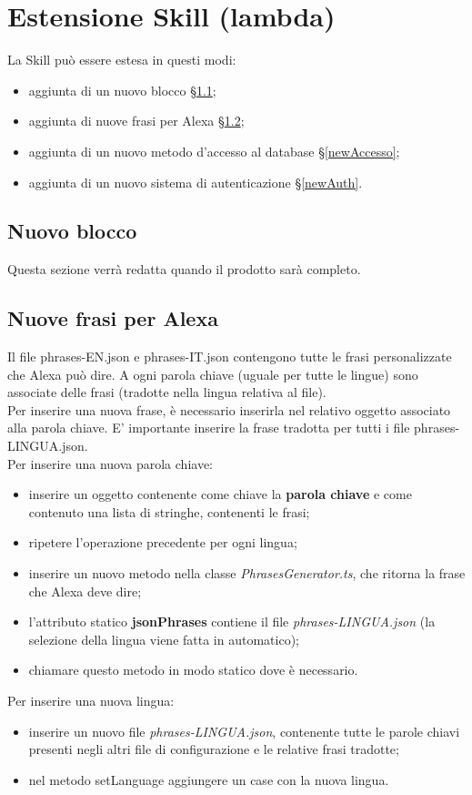 \section{Estensione Skill (lambda)}
La Skill può essere estesa in questi modi:
\begin{itemize}
    \item aggiunta di un nuovo blocco \S\ref{newBlock};
    \item aggiunta di nuove frasi per Alexa \S\ref{newFrasi};
    \item aggiunta di un nuovo metodo d'accesso al database \S\ref{newAccesso};
    \item aggiunta di un nuovo sistema di autenticazione \S\ref{newAuth}.
\end{itemize}
\subsection{Nuovo blocco}\label{newBlock}
Questa sezione verrà redatta quando il prodotto sarà completo.
\subsection{Nuove frasi per Alexa}\label{newFrasi}
Il file phrases-EN.json e phrases-IT.json contengono tutte le frasi personalizzate che Alexa può dire. A ogni parola chiave (uguale per tutte le lingue) sono associate delle frasi (tradotte nella lingua relativa al file).\\
Per inserire una nuova frase, è necessario inserirla nel relativo oggetto associato alla parola chiave. E' importante inserire la frase tradotta per tutti i file phrases-LINGUA.json.\\
Per inserire una nuova parola chiave:
\begin{itemize}
	\item inserire un oggetto contenente come chiave la \textbf{parola chiave} e come contenuto una lista di stringhe, contenenti le frasi;
	\item ripetere l'operazione precedente per ogni lingua;
	\item inserire un nuovo metodo nella classe \textit{PhrasesGenerator.ts}, che ritorna la frase che Alexa deve dire;
	\item l'attributo statico \textbf{jsonPhrases} contiene il file \textit{phrases-LINGUA.json} (la selezione della lingua viene fatta in automatico);
	\item chiamare questo metodo in modo statico dove è necessario.
\end{itemize}
Per inserire una nuova lingua:
\begin{itemize}
	\item inserire un nuovo file \textit{phrases-LINGUA.json}, contenente tutte le parole chiavi presenti negli altri file di configurazione e le relative frasi tradotte;
	\item nel metodo setLanguage aggiungere un case con la nuova lingua.
\end{itemize} 
